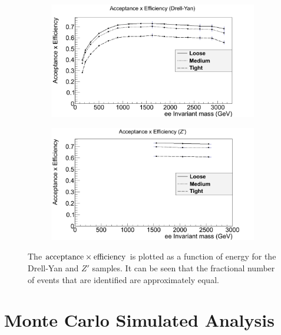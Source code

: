 \documentclass{article}
\begin{document}
\begin{figure}[htb]
	\centering
    \begin{subfigure}{.49\textwidth}
    	\raggedleft
        \includegraphics[width=1.13\textwidth]{images/acceptanceDY.png}
        \caption{}
        \label{fig:acceptanceDY}
    \end{subfigure}
    \begin{subfigure}{.49\textwidth}
    	\raggedright
        \includegraphics[width=1.13\textwidth]{images/acceptanceZ.png}
        \caption{}
        \label{fig:acceptanceZ}
    \end{subfigure}    	
    \caption{ The $\rm{acceptance}\times\rm{efficiency}$ is plotted as a function of energy for the Drell-Yan and $Z'$ samples. It can be seen that the fractional number of events that are identified are approximately equal. \label{fig:acceptance}}
\end{figure}

\section{Monte Carlo Simulated Analysis}
\label{sec:MonteCarloSimulatedAnalysis}
\end{document}
